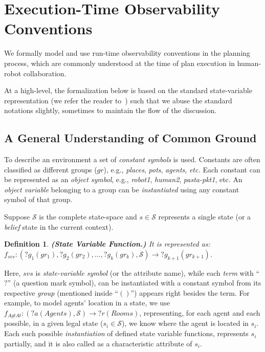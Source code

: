 \documentclass[letterpaper]{article} %
\newtheorem{definition}{Definition}
\begin{document}


\section{Execution-Time Observability Conventions}
We formally model and use run-time observability conventions in the planning process, which are commonly understood at the time of plan execution in human-robot collaboration. 

At a high-level, the formalization below is based on the standard state-variable representation (we refer the reader to~\cite{naubooks0014222}) such that we abuse the standard notations slightly, sometimes to maintain the flow of the discussion.

\subsection{A General Understanding of Common Ground}
To describe an environment a set of \textit{constant symbols} is used. 
Constants are often classified as different groups ($gr$), e.g., \textit{places}, \textit{pots}, \textit{agents}, \textit{etc.} 
Each constant can be represented as an \textit{object symbol}, e.g., \textit{robot1}, \textit{human2}, \textit{pasta-pkt1}, etc. 
An \textit{object variable} belonging to a group can be \textit{instantiated} using any constant symbol of that group.

Suppose $\mathcal{S}$ is the complete state-space and $s \in \mathcal{S}$ represents a single state (or a \textit{belief} state in the current context).  


\begin{definition}
\textbf{(State Variable Function.)} It is represented as: $f_{svs}:(?g_1 (gr_1), ?g_2 (gr_2), ..., ?g_k (gr_k),\mathcal{S})\rightarrow ?g_{k+1} (gr_{k+1})$. 
\end{definition}
Here, $svs$ is \textit{state-variable symbol} (or the attribute name), while each \textit{term} with ``$?$'' (a question mark symbol), can be instantiated with a constant symbol from its respective \textit{group} (mentioned inside ``$()$'') appears right besides the term. 
For example, to model agents' location in a state, we use $f_{\textit{AgtAt}}:(?a (Agents), \mathcal{S}) \rightarrow ?r (Rooms)$, representing, for each agent and each possible, in a given legal state ($s_i \in \mathcal{S}$), we know where the agent is located in $s_i$. 
Each such possible \textit{instantiation} of defined state variable functions, represents $s_i$ partially, and it is also called as a characteristic attribute of $s_i$.     
\end{document}
